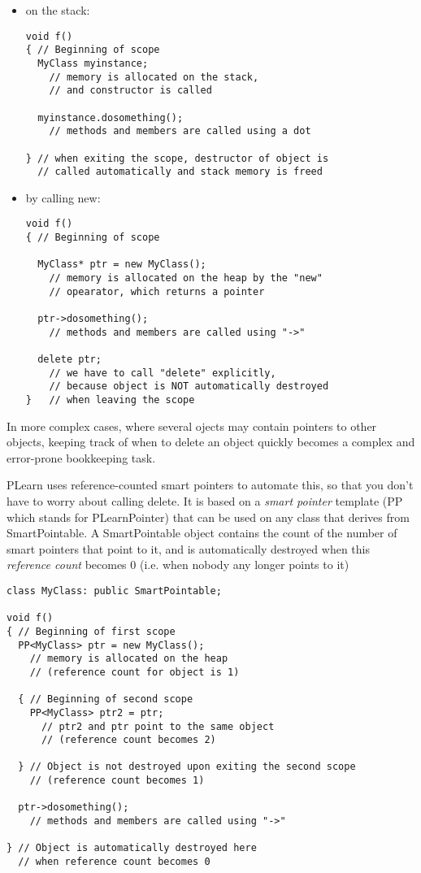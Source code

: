 \documentclass[11pt]{book}
\begin{document}
\begin{itemize}
\item  on the stack:
\begin{verbatim}
void f()
{ // Beginning of scope
  MyClass myinstance; 
    // memory is allocated on the stack,
    // and constructor is called

  myinstance.dosomething();
    // methods and members are called using a dot

} // when exiting the scope, destructor of object is
  // called automatically and stack memory is freed
\end{verbatim}

\item  by calling new:
\begin{verbatim}
void f()
{ // Beginning of scope

  MyClass* ptr = new MyClass(); 
    // memory is allocated on the heap by the "new"
    // opearator, which returns a pointer

  ptr->dosomething(); 
    // methods and members are called using "->"

  delete ptr;
    // we have to call "delete" explicitly,
    // because object is NOT automatically destroyed
}   // when leaving the scope
\end{verbatim}

\end{itemize}
 In more complex cases, where several ojects may contain pointers to other objects, keeping track of when to delete an object quickly becomes a complex and error-prone bookkeeping task. 


 PLearn uses reference-counted smart pointers to automate this, so
that you don't have to worry about calling delete. It is based on a
\emph{smart pointer} template (PP which stands for PLearnPointer)
that can be used on any class that derives from SmartPointable. A
SmartPointable object contains the count of the number of smart
pointers that point to it, and is automatically destroyed when this
\emph{reference count} becomes 0 (i.e. when nobody any longer points
to it)

\begin{verbatim}
class MyClass: public SmartPointable;

void f()
{ // Beginning of first scope
  PP<MyClass> ptr = new MyClass();
    // memory is allocated on the heap
    // (reference count for object is 1)

  { // Beginning of second scope
    PP<MyClass> ptr2 = ptr;
      // ptr2 and ptr point to the same object
      // (reference count becomes 2)

  } // Object is not destroyed upon exiting the second scope 
    // (reference count becomes 1)

  ptr->dosomething();
    // methods and members are called using "->"

} // Object is automatically destroyed here 
  // when reference count becomes 0
\end{verbatim}
\end{document}
